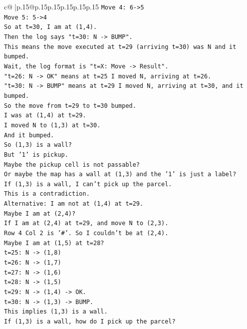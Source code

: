 \documentclass{article}
\begin{document}
{\begin{supertabular}{c@{$\;$}|p{.15\linewidth}@{}p{.15\linewidth}p{.15\linewidth}p{.15\linewidth}p{.15\linewidth}p{.15\linewidth}}
{{{\texttt{Move 4: 6{-}>5} \\
\texttt{Move 5: 5{-}>4} \\
\texttt{So at t=30, I am at (1,4).} \\
\texttt{Then the log says "t=30: N {-}> BUMP".} \\
\texttt{This means the move executed at t=29 (arriving t=30) was N and it bumped.} \\
\texttt{Wait, the log format is "t=X: Move {-}> Result".} \\
\texttt{"t=26: N {-}> OK" means at t=25 I moved N, arriving at t=26.} \\
\texttt{"t=30: N {-}> BUMP" means at t=29 I moved N, arriving at t=30, and it bumped.} \\
\texttt{So the move from t=29 to t=30 bumped.} \\
\texttt{I was at (1,4) at t=29.} \\
\texttt{I moved N to (1,3) at t=30.} \\
\texttt{And it bumped.} \\
\texttt{So (1,3) is a wall?} \\
\texttt{But '1' is pickup.} \\
\texttt{Maybe the pickup cell is not passable?} \\
\texttt{Or maybe the map has a wall at (1,3) and the '1' is just a label?} \\
\texttt{If (1,3) is a wall, I can't pick up the parcel.} \\
\texttt{This is a contradiction.} \\
\texttt{Alternative: I am not at (1,4) at t=29.} \\
\texttt{Maybe I am at (2,4)?} \\
\texttt{If I am at (2,4) at t=29, and move N to (2,3).} \\
\texttt{Row 4 Col 2 is '\#'. So I couldn't be at (2,4).} \\
\texttt{Maybe I am at (1,5) at t=28?} \\
\texttt{t=25: N {-}> (1,8)} \\
\texttt{t=26: N {-}> (1,7)} \\
\texttt{t=27: N {-}> (1,6)} \\
\texttt{t=28: N {-}> (1,5)} \\
\texttt{t=29: N {-}> (1,4) {-}> OK.} \\
\texttt{t=30: N {-}> (1,3) {-}> BUMP.} \\
\texttt{This implies (1,3) is a wall.} \\
\texttt{If (1,3) is a wall, how do I pick up the parcel?} \\
}}}
\end{supertabular}}
\end{document}
